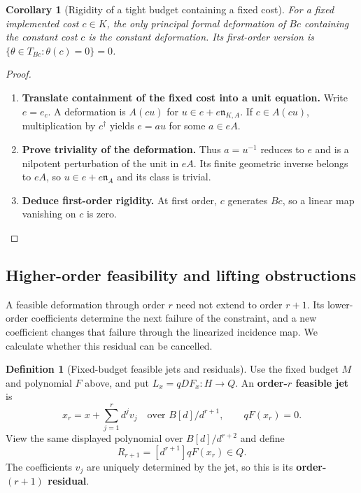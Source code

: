 \documentclass[11pt,a4paper]{article}
\numberwithin{algorithm}{section}
\numberwithin{equation}{section}
\newtheorem{corollary}[corollary]{Corollary}
\theoremstyle{definition}
\newtheorem{definition}[definition]{Definition}
\theoremstyle{remark}
\theoremstyle{plain}
\theoremstyle{definition}
\theoremstyle{plain}
\begin{document}
\begin{corollary}[Rigidity of a tight budget containing a fixed cost]
\label{cor:tight-budget-rigidity}
For a fixed implemented cost $c\in K$, the only principal formal
deformation of $Bc$ containing the constant cost $c$ is the
constant deformation. Its first-order version is
$\{\theta\in T_{Bc}:\theta(c)=0\}=0$.
\end{corollary}
\begin{proof}\leavevmode
\begin{enumerate}[leftmargin=*,align=left]
\item \textbf{Translate containment of the fixed cost into a unit equation.}
Write $e=e_c$. A deformation is $A(cu)$ for
$u\in e+e\mathfrak n_{K,A}$. If $c\in A(cu)$, multiplication
by $c^\dagger$ yields $e=au$ for some $a\in eA$.

\item \textbf{Prove triviality of the deformation.}
Thus $a=u^{-1}$ reduces to $e$ and is a nilpotent perturbation
of the unit in $eA$. Its finite geometric inverse belongs to
$eA$, so $u\in e+e\mathfrak n_A$ and its class is trivial.

\item \textbf{Deduce first-order rigidity.}
At first order, $c$ generates $Bc$, so a linear map vanishing
on $c$ is zero.
\end{enumerate}
\end{proof}

\subsection{Higher-order feasibility and lifting obstructions}
\label{sec:feasibility-obstructions}
A feasible deformation through order $r$ need not extend to
order $r+1$. Its lower-order coefficients determine the next
failure of the constraint, and a new coefficient changes that
failure through the linearized incidence map. We calculate
whether this residual can be cancelled.


\begin{definition}[Fixed-budget feasible jets and residuals]\label{def:fixed-feasible-jets}
Use the fixed budget $M$ and polynomial $F$ above, and put
$L_x=qDF_x:H\to Q$. An \textbf{order-$r$ feasible jet} is
\[
 x_r=x+\sum_{j=1}^r d^jv_j\quad\text{over }B[d]/d^{r+1},
 \qquad qF(x_r)=0.
\]
View the same displayed polynomial over $B[d]/d^{r+2}$ and define
\[
 R_{r+1}=[d^{r+1}]qF(x_r)\in Q.
\]
The coefficients $v_j$ are uniquely determined by the jet, so
this is its \textbf{order-$(r+1)$ residual}.
\end{definition}
\end{document}
